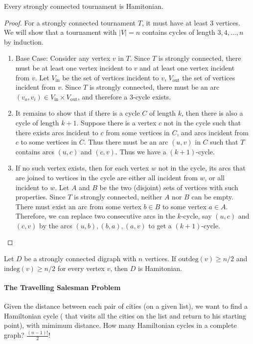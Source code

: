 \begin{theorem}[Camion]
Every strongly connected tournament is Hamitonian.
\end{theorem}
\begin{proof}
For a strongly connected tournament $T$, it must have at least 3 vertices.
We will show that a tournament with $|V|=n$ contains cycles of length $3,4,\dots,n$ by induction.
\begin{enumerate}
\item
Base Case:
Consider any vertex $v$ in $T$. Since $T$ is strongly connected, there must be at least one vertex incident to $v$ and at least one vertex incident from $v$.
Let $V_{\text{in}}$ be the set of vertices incident to $v$, $V_{\text{out}}$ the set of vertices incident from $v$.
Since $T$ is strongly connected, there must be an arc $(v_o,v_i)\in V_{\text{in}}\times V_{\text{out}}$, and therefore a 3-cycle exists.
\item
It remains to show that if there is a cycle $C$ of length $k$, then there is also a cycle of length $k+1$.
Suppose there is a vertex $c$ not in the cycle such that 
there exists arcs incident to $c$ from some vertices in $C$, and arcs 
incident from $c$ to some vertices in $C$.
Thus there must be an arc $(u,v)$ in $C$ such that $T$ contains arcs $(u,c)$ and $(c,v)$. Thus we have a $(k+1)$-cycle.
\item
If no such vertex exists, then for each vertex $w$ not in the cycle, its arcs that are joined to vertices in the cycle are
either all incident from $w$,
or all incident to $w$.
Let $A$ and $B$ be the two (disjoint) sets of vertices with such properties.
Since $T$ is strongly connected, neither $A$ nor $B$ can be empty.
There must exist an arc from some vertex $b\in B$ to some vertex $a\in A$.
Therefore, we can replace two consecutive arcs in the $k$-cycle, say $(u,c)$ and $(c,v)$ by the arcs $(u,b),(b,a),(a,v)$ to get a $(k+1)$-cycle.
\end{enumerate}
\end{proof}

\begin{theorem}
Let $D$ be a strongly connected digraph with $n$ vertices.
If $\text{outdeg}(v)\ge n/2$ and $\text{indeg}(v)\ge n/2$ for every vertex $v$, then $D$ is Hamitonian.
\end{theorem}

\paragraph{The Travelling Salesman Problem}
Given the distance between each pair of cities (on a given list), we want to find a Hamiltonian cycle ( that visits all the cities on the list and return to his starting point), with mimimum distance.
How many Hamiltonian cycles in a complete graph? $\frac{(n-1)!}{2}!$
























